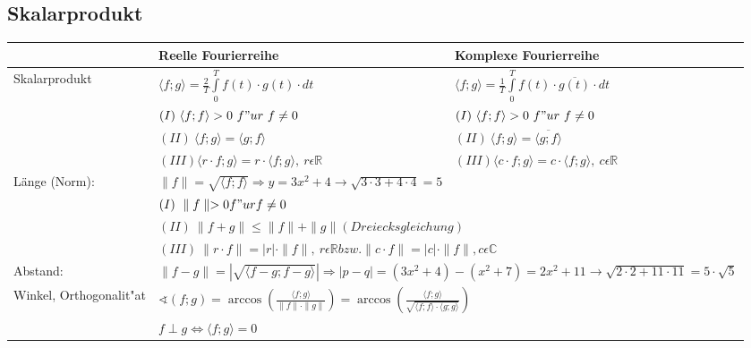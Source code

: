 \subsection{Skalarprodukt}
	\begin{tabular}{|p{3cm}|p{7cm}|p{7cm}|}
	    \hline
	    & Reelle Fourierreihe & Komplexe Fourierreihe \\
	    \hline
	    Skalarprodukt &  $\langle f;g \rangle = \frac{2}{T}\int\limits_0^Tf(t)\cdot
	    g(t)\cdot dt $ & $\langle f;g \rangle = \frac{1}{T}\int\limits_0^Tf(t)\cdot
	    \overline{g(t)}\cdot dt $ \\
	    & $(I)\ \langle f;f \rangle > 0\ f"ur\ f\neq 0$ &
	    $(I)\ \langle f;f \rangle > 0\ f"ur\ f\neq 0$ \\
	    & $(II)\ \langle f;g \rangle = \langle g;f \rangle $ &
	    $(II)\ \langle f;g \rangle = \overline{\langle g;f \rangle} $ \\
	    & $(III) \langle r\cdot f;g\rangle = r\cdot\langle f;g\rangle,\ r\epsilon
	    \mathbb R$ & $(III) \langle c\cdot f;g\rangle = c\cdot\langle f;g\rangle,\ 
	    c\epsilon \mathbb R$
	    \\
	    \hline
	    Länge (Norm): & \multicolumn{2}{|l|}{
	    $\parallel f \parallel = \sqrt{\langle
	    f;f \rangle} \Rightarrow y=3x^2+4 \rightarrow \sqrt{3\cdot3+4\cdot4}=5$ 
	    } \\
	    & \multicolumn{2}{|l|}{ $ (I)\ \parallel f \parallel > 0 f"ur f \neq 0$} \\
	    & \multicolumn{2}{|l|}{ $ (II)\ \parallel f+g \parallel \leq \parallel f
	    \parallel + \parallel g \parallel (Dreiecksgleichung)$} \\
	    & \multicolumn{2}{|l|}{ $ (III)\ \parallel r\cdot f \parallel = |r| \cdot
	    \parallel f \parallel , \ r \epsilon \mathbb R bzw. \parallel c\cdot
	    f\parallel = |c|\cdot \parallel f \parallel, c\epsilon\mathbb C$} \\
	    \hline
	    Abstand: & \multicolumn{2}{|l|}{ $ \parallel f-g \parallel =
	    |\sqrt{\langle f-g;f-g \rangle}| \Rightarrow
	    |p-q|=(3x^2+4)-(x^2+7)=2x^2+11 \rightarrow
	    \sqrt{2\cdot2+11\cdot11}=5\cdot\sqrt{5}$}
	    \\
	    \hline
	    Winkel, Orthogonalit"at &
	    \multicolumn{2}{|l|}{
	    $\sphericalangle(f;g)=\arccos\left( \frac{\langle f;g \rangle}{\parallel f
	    \parallel \cdot \parallel g \parallel} \right) = \arccos\left(\frac{\langle f;g 
	    \rangle}{\sqrt{\langle f;f\rangle \cdot \langle g;g\rangle}}\right)$} \\
	     & \multicolumn{2}{|l|}{$f \perp g\Leftrightarrow \langle f;g \rangle = 0$}
	     \\
	    
	    
	    \hline
	\end{tabular}

